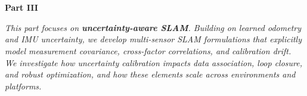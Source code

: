 \chapter*{} %
\begin{center}
    \vspace*{3.5cm} 
{\Huge \textbf{Part III} \\ [1cm]}
{\LARGE \textbf{\partIIITitle}}
\end{center}

\vspace{2cm}

\begin{center}
\textit{This part focuses on \textbf{uncertainty-aware SLAM}. Building on learned odometry and IMU uncertainty, we develop multi-sensor SLAM formulations that explicitly model measurement covariance, cross-factor correlations, and calibration drift. We investigate how uncertainty calibration impacts data association, loop closure, and robust optimization, and how these elements scale across environments and platforms.}
\end{center}
